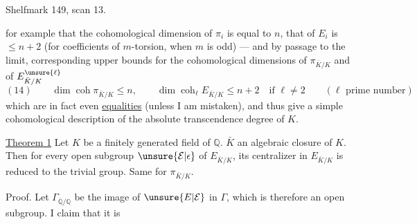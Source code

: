 Shelfmark 149, scan 13.

for example that the cohomological dimension of $\pi_i$ is equal to $n$, that of $E_i$ is $\leq n+2$ (for coefficients  of $m$-torsion, when $m$ is odd) --- and by passage to the limit, corresponding upper bounds for the cohomological dimensions of $\pi_{\bar K/K}$ and of $E_{\bar K/K}^{\unsure{\ell}}$
\[
(14)\qquad \dim\operatorname{coh}\pi_{\bar K/K}\leq n,\qquad
\dim\operatorname{coh}_{\ell}E_{\bar K/K}\leq n+2\quad\text{if }\ell\neq2
\qquad(\ell\text{ prime number})
\]
which are in fact even \uline{equalities} (unless I am mistaken), and thus give a simple cohomological description of the absolute transcendence degree of $K$.

\uline{Theorem 1} Let $K$ be a finitely generated field  of $\mathbb Q$.  $\bar K$ an algebraic closure of $K$. Then for every open subgroup $\unsure{\mathcal E|\epsilon}$ of $E_{\bar K/K}$, its centralizer in $E_{\bar K/K}$ is reduced to the trivial group. Same for $\pi_{\bar K/K}$.

Proof. Let $\Gamma_{\overline{\mathbb Q}/\mathbb Q}$ be the image of $\unsure{E|\mathcal E}$ in $\Gamma$, which is therefore an open subgroup.   I claim that it is
